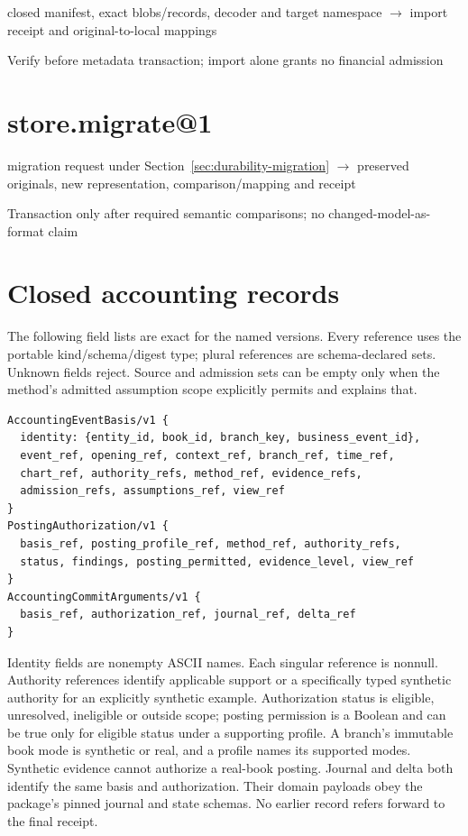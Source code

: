 closed manifest, exact blobs/records, decoder and target namespace \ensuremath{\rightarrow} import receipt and original-to-local mappings

Verify before metadata transaction; import alone grants no financial admission

\hypertarget{store.migrate1}{%
\section{store.migrate@1}\label{store.migrate1}}

migration request under Section~\ref{sec:durability-migration}
\ensuremath{\rightarrow} preserved originals, new representation,
comparison/mapping and receipt

Transaction only after required semantic comparisons; no changed-model-as-format claim

\section{Closed accounting records}

The following field lists are exact for the named versions. Every reference
uses the portable kind/schema/digest type; plural references are schema-declared
sets. Unknown fields reject. Source and admission sets can be empty only when
the method's admitted assumption scope explicitly permits and explains that.

\begin{lstlisting}
AccountingEventBasis/v1 {
  identity: {entity_id, book_id, branch_key, business_event_id},
  event_ref, opening_ref, context_ref, branch_ref, time_ref,
  chart_ref, authority_refs, method_ref, evidence_refs,
  admission_refs, assumptions_ref, view_ref
}
PostingAuthorization/v1 {
  basis_ref, posting_profile_ref, method_ref, authority_refs,
  status, findings, posting_permitted, evidence_level, view_ref
}
AccountingCommitArguments/v1 {
  basis_ref, authorization_ref, journal_ref, delta_ref
}
\end{lstlisting}

Identity fields are nonempty ASCII names. Each singular reference is nonnull.
Authority references identify applicable support or a specifically typed
synthetic authority for an explicitly synthetic example. Authorization status
is eligible, unresolved, ineligible or outside scope; posting permission is a
Boolean and can be true only for eligible status under a supporting profile.
A branch's immutable book mode is synthetic or real, and a profile names its
supported modes. Synthetic evidence cannot authorize a real-book posting.
Journal and delta both identify the same basis and authorization. Their domain
payloads obey the package's pinned journal and state schemas. No earlier record
refers forward to the final receipt.

